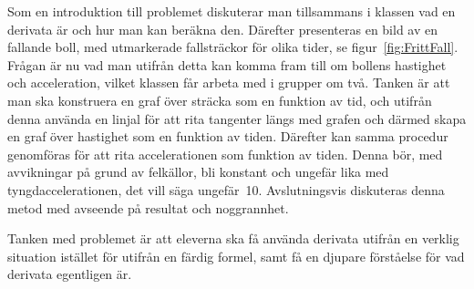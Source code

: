     \textcolor{lila}{Som en introduktion till problemet diskuterar man tillsammans i klassen vad en derivata är och hur man kan beräkna den. Därefter presenteras en bild av en fallande boll, med utmarkerade fallsträckor för olika tider, se figur~\ref{fig:FrittFall}. Frågan är nu vad man utifrån detta kan komma fram till om bollens hastighet och acceleration, vilket klassen får arbeta med i grupper om två. Tanken är att man ska konstruera en graf över sträcka som en funktion av tid, och utifrån denna använda en linjal för att rita tangenter längs med grafen och därmed skapa en graf över hastighet som en funktion av tiden. Därefter kan samma procedur genomföras för att rita accelerationen som funktion av tiden. Denna bör, med avvikningar på grund av felkällor, bli konstant och ungefär lika med tyngdaccelerationen, det vill säga ungefär~10. Avslutningsvis diskuteras denna metod med avseende på resultat och noggrannhet.}
    
    \textcolor{lila}{Tanken med problemet är att eleverna ska få använda derivata utifrån en verklig situation istället för utifrån en färdig formel, samt få en djupare förståelse för vad derivata egentligen är.} 
        
